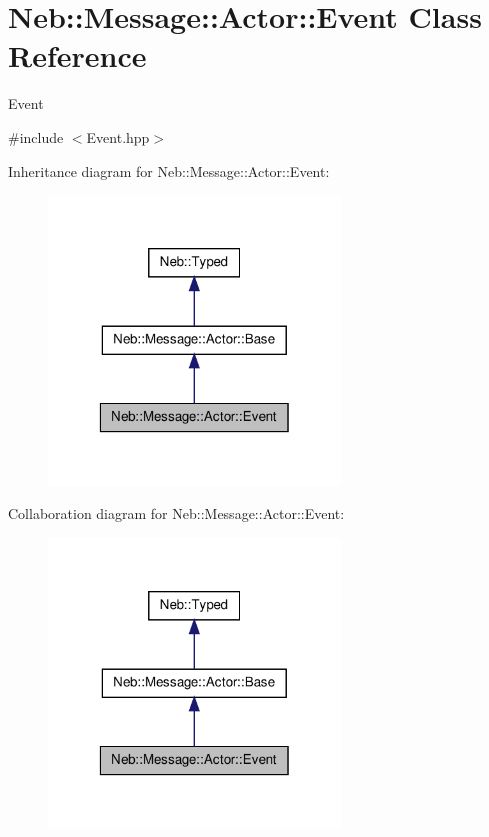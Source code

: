\hypertarget{classNeb_1_1Message_1_1Actor_1_1Event}{\section{\-Neb\-:\-:\-Message\-:\-:\-Actor\-:\-:\-Event \-Class \-Reference}
\label{classNeb_1_1Message_1_1Actor_1_1Event}
}


\-Event  




{\ttfamily \#include $<$\-Event.\-hpp$>$}



\-Inheritance diagram for \-Neb\-:\-:\-Message\-:\-:\-Actor\-:\-:\-Event\-:\nopagebreak
\begin{figure}[H]
\begin{center}
\leavevmode
\includegraphics[width=220pt]{classNeb_1_1Message_1_1Actor_1_1Event__inherit__graph}
\end{center}
\end{figure}


\-Collaboration diagram for \-Neb\-:\-:\-Message\-:\-:\-Actor\-:\-:\-Event\-:\nopagebreak
\begin{figure}[H]
\begin{center}
\leavevmode
\includegraphics[width=220pt]{classNeb_1_1Message_1_1Actor_1_1Event__coll__graph}
\end{center}
\end{figure}
